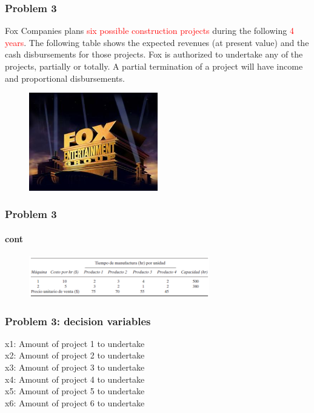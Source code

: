 \documentclass[10pt,svgnames,fragile]{beamer}
\begin{document}
\begin{frame}
\frametitle{Problem 3}

Fox Companies plans \textcolor{red}{six possible construction projects} during the following \textcolor{red}{4 years}. The following table shows the expected revenues (at present value) and the cash disbursements for those projects. Fox is authorized to undertake any of the projects, partially or totally. A partial termination of a project will have income and proportional disbursements.

\begin{figure}
\includegraphics[width=0.5\textwidth]{images/C.jpg}
\end{figure}



\end{frame}


\begin{frame}

\frametitle{Problem 3}
\framesubtitle{cont}
\begin{figure}
\includegraphics[width=0.7\textwidth]{images/io3.PNG}
\end{figure}
\end{frame}


\begin{frame}[label={sec:orge9abdcb}]{}
\frametitle{Problem 3: decision variables }

x1: Amount of project 1 to undertake\\
x2: Amount of project 2 to undertake\\
x3: Amount of project 3 to undertake\\
x4: Amount of project 4 to undertake\\
x5: Amount of project 5 to undertake\\
x6: Amount of project 6 to undertake\\


\end{frame}
\end{document}
